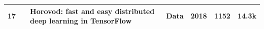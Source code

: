 \begin{table}[htbp]
\begin{tabular}{llp{8.01cm}p{2cm}lll}
		17          & \cite{sergeev_horovod_2018}      & Horovod: fast and easy distributed deep learning in TensorFlow                                            & Data           & 2018          & 1152               & 14.3k \cite{noauthor_horovodhorovod_2025}                     \\[1ex]
		\hline
	\end{tabular}
\end{table}

